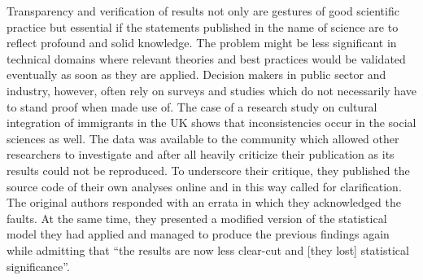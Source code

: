 \documentclass{acm_proc_article-sp}
\begin{document}
Transparency and verification of results not only are gestures of good scientific practice but essential if the statements published in the name of science are to reflect profound and solid knowledge.
The problem might be less significant in technical domains where relevant theories and best practices would be validated eventually as soon as they are applied.
Decision makers in public sector and industry, however, often rely on surveys and studies which do not necessarily have to stand proof when made use of. 
The case of a research study on cultural integration of immigrants in the UK  
shows that inconsistencies occur in the social sciences as well.
The data was available to the community \cite{dataset_FNSEM} which allowed other researchers to investigate and after all heavily criticize their publication as its results could not be reproduced. \cite{arai2011fragile}
To underscore their critique, they published the source code of their own analyses online and in this way called for clarification. %
The original authors responded with an errata in which they acknowledged the faults.
At the same time, they presented a modified version of the statistical model they had applied and managed to produce the previous findings again while admitting that ``the results are now less clear-cut and [they lost] statistical significance''. \cite{bisin2011errata} 
%
%
 
\end{document}
